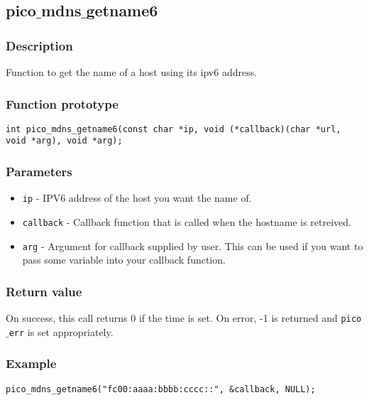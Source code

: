 \subsection{pico$\_$mdns$\_$getname6}

\subsubsection*{Description}
Function to get the name of a host using its ipv6 address.

\subsubsection*{Function prototype}
\begin{verbatim}
int pico_mdns_getname6(const char *ip, void (*callback)(char *url, void *arg), void *arg);
\end{verbatim}

\subsubsection*{Parameters}
\begin{itemize}[noitemsep]
\item \texttt{ip} - IPV6 address of the host you want the name of.
\item \texttt{callback} - Callback function that is called when the hostname is retreived.
\item \texttt{arg} - Argument for callback supplied by user. This can be used if you want to pass some variable into your callback function.
\end{itemize}

\subsubsection*{Return value}
On success, this call returns 0 if the time is set.
On error, -1 is returned and \texttt{pico$\_$err} is set appropriately.

\subsubsection*{Example}
\begin{verbatim}
pico_mdns_getname6("fc00:aaaa:bbbb:cccc::", &callback, NULL);
\end{verbatim}
